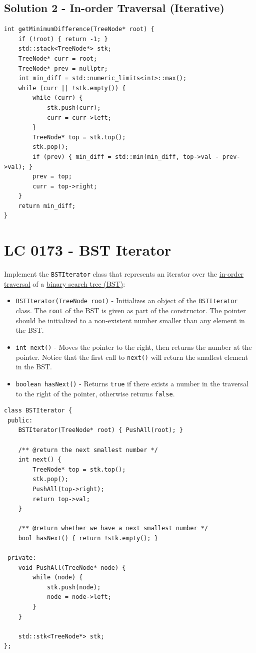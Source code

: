 \subsection*{Solution 2 - In-order Traversal (Iterative)}
\begin{lstlisting}
int getMinimumDifference(TreeNode* root) {
	if (!root) { return -1; }
	std::stack<TreeNode*> stk;
	TreeNode* curr = root;
	TreeNode* prev = nullptr;
	int min_diff = std::numeric_limits<int>::max();
	while (curr || !stk.empty()) {
		while (curr) {
			stk.push(curr);
			curr = curr->left;
		}
		TreeNode* top = stk.top();
		stk.pop();
		if (prev) { min_diff = std::min(min_diff, top->val - prev->val); }
		prev = top;
		curr = top->right;
	}
	return min_diff;
}
\end{lstlisting}

\section{LC 0173 - BST Iterator}
Implement the {\colorbox{CodeBackground}{\lstinline|BSTIterator|}} class that represents an iterator over the \ul{in-order traversal} of a \ul{binary search tree (BST)}:
\begin{itemize}
	\item {\colorbox{CodeBackground}{\lstinline|BSTIterator(TreeNode root)|}} - Initializes an object of the {\colorbox{CodeBackground}{\lstinline|BSTIterator|}} class. The {\colorbox{CodeBackground}{\lstinline|root|}} of the BST is given as part of the constructor. The pointer should be initialized to a non-existent number smaller than any element in the BST.
	\item {\colorbox{CodeBackground}{\lstinline|int next()|}} - Moves the pointer to the right, then returns the number at the pointer. Notice that the first call to {\colorbox{CodeBackground}{\lstinline|next()|}} will return the smallest element in the BST.
	\item {\colorbox{CodeBackground}{\lstinline|boolean hasNext()|}} - Returns {\colorbox{CodeBackground}{\lstinline|true|}} if there exists a number in the traversal to the right of the pointer, otherwise returns {\colorbox{CodeBackground}{\lstinline|false|}}.
\end{itemize}


\begin{lstlisting}
class BSTIterator {
 public:
	BSTIterator(TreeNode* root) { PushAll(root); }
	
	/** @return the next smallest number */
	int next() {
		TreeNode* top = stk.top();
		stk.pop();
		PushAll(top->right);
		return top->val;
	}
	
	/** @return whether we have a next smallest number */
	bool hasNext() { return !stk.empty(); }
	
 private:
	void PushAll(TreeNode* node) {
		while (node) {
			stk.push(node);
			node = node->left;
		}
	}
	
	std::stk<TreeNode*> stk;
};
\end{lstlisting}


